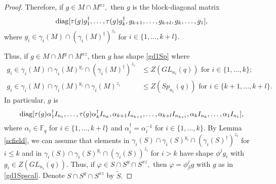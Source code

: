 \begin{proof}

 Therefore, if $g \in M \cap M^{xz},$ then $g$ is the block-diagonal matrix
\begin{equation}\label{gd1Sp}
\mathrm{diag} [\tau(g)g_1^{\dagger}, \ldots, \tau(g)g_k^{\dagger}, g_{k+1}, \ldots, g_{k+l}, g_k, \ldots, g_1],
\end{equation}
where $g_i \in \gamma_i(M) \cap (\gamma_i(M)^{\dagger})^{z_i}$ for $i\in \{1, \ldots, k+l\}.$ 



Thus, if $g \in M \cap M^{y} \cap M^{xz}$, then $g$ has shape \eqref{gd1Sp} where
\begin{equation*}
\begin{split}
g_i \in \gamma_i(M) \cap \gamma_i(M)^{y_i} \cap (\gamma_i(M)^{\dagger})^{z_i} & \le Z(GL_{n_i}(q)) \text{ for } i \in \{1, \ldots, k\}; \\
g_i \in \gamma_i(M) \cap \gamma_i(M)^{y_i} \cap \gamma_i(M)^{z_i} & \le Z(Sp_{n_i}(q)) \text{ for } i \in \{k+1, \ldots, k+l\}. 
\end{split}
\end{equation*} In particular, $g$ is 
\begin{equation}\label{gd1Spscal}
\Scale[0.97]{
\diag [\tau(g)\alpha_1^{\dagger} I_{n_1}, \ldots, \tau(g)\alpha_{k}^{\dagger} I_{n_k}, \alpha_{k+1} I_{n_{k+1}}, \ldots, \alpha_{k+l} I_{n_{k+l}}, \alpha_{k} I_{n_k}, \ldots, \alpha_{1} I_{n_1}]},
\end{equation}
where $\alpha_i \in \mathbb{F}_{q}$ for $i \in \{1, \ldots, k+l\}$  and $\alpha_i^{\dagger}=\alpha_i^{-1}$ for $i \in \{1, \ldots, k\}$.
By Lemma \ref{scfield}, we can assume that elements in $\gamma_i(S) \cap \gamma_i(S)^{y_i} \cap (\gamma_i(S)^{\dagger})^{z_i}$ for $i \le k$ and in $\gamma_i(S) \cap \gamma_i(S)^{y_i} \cap (\gamma_i(S))^{z_i}$ for $i>k$ have shape $\phi^j g_i$ with $g_i \in Z(GL_{n_i}(q)).$ Thus, if $\varphi \in S \cap S^y \cap S^{xz},$ then $\varphi = \phi^j_{\beta} g$ with $g$ as in \eqref{gd1Spscal}.
  Denote $S \cap S^{y} \cap S^{xz}$ by $\tilde{S}.$



\end{proof}
